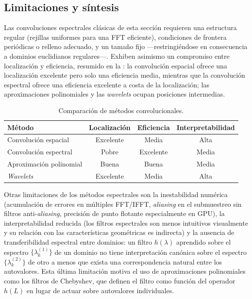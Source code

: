 \subsection{Limitaciones y s\'intesis}
\label{sec:grids:spectral-limits}

Las convoluciones espectrales cl\'asicas de esta secci\'on requieren una
estructura regular (rejillas uniformes para una FFT eficiente), condiciones de
frontera peri\'odicas o relleno adecuado, y un tama\~no fijo ---restringi\'endose
en consecuencia a dominios euclidianos regulares---. Exhiben asimismo un
compromiso entre localizaci\'on y eficiencia, resumido en la
: la convoluci\'on espacial ofrece una localizaci\'on
excelente pero solo una eficiencia media, mientras que la convoluci\'on
espectral ofrece una eficiencia excelente a costa de la localizaci\'on; las
aproximaciones polinomiales y las \emph{wavelets} ocupan posiciones
intermedias.

\begin{table}[h]
\centering
\caption{Comparaci\'on de m\'etodos convolucionales.}
\label{tab:grids:methods}
\begin{tabular}{@{}lccc@{}}
\toprule
\textbf{M\'etodo} & \textbf{Localizaci\'on} & \textbf{Eficiencia} & \textbf{Interpretabilidad} \\
\midrule
Convoluci\'on espacial      & Excelente & Media     & Alta  \\
Convoluci\'on espectral     & Pobre     & Excelente & Media \\
Aproximaci\'on polinomial   & Buena     & Buena     & Media \\
\emph{Wavelets}             & Excelente & Media     & Alta  \\
\bottomrule
\end{tabular}
\end{table}

Otras limitaciones de los m\'etodos espectrales son la inestabilidad num\'erica
(acumulaci\'on de errores en m\'ultiples FFT/IFFT, \emph{aliasing} en el
submuestreo sin filtros anti-\emph{aliasing}, precisi\'on de punto flotante
especialmente en GPU), la interpretabilidad reducida (los filtros espectrales son
menos intuitivos visualmente y su relaci\'on con las caracter\'isticas
geom\'etricas es indirecta) y la ausencia de transferibilidad espectral entre
dominios: un filtro $h(\lambda)$ aprendido sobre el espectro
$\{\lambda_k^{(1)}\}$ de un dominio no tiene interpretaci\'on can\'onica sobre el
espectro $\{\lambda_k^{(2)}\}$ de otro a menos que exista una correspondencia
natural entre los autovalores. Esta \'ultima limitaci\'on motiva el uso de
aproximaciones polinomiales como los filtros de Chebyshev, que definen el filtro
como funci\'on del operador $h(L)$ en lugar de actuar sobre autovalores
individuales.


